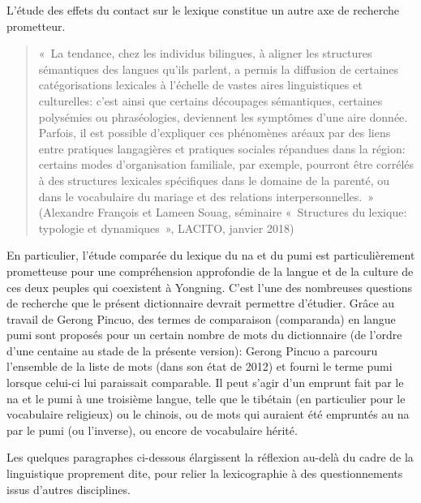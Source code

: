 L'étude des effets du contact sur le lexique constitue un autre axe de recherche prometteur.

\begin{quote}
« La tendance, chez les individus bilingues, à aligner les structures sémantiques des langues qu’ils parlent, a permis la diffusion de certaines catégorisations lexicales à l’échelle de vastes aires linguistiques et culturelles: c’est ainsi que certains découpages sémantiques, certaines polysémies ou phraséologies, deviennent les symptômes d’une aire donnée. Parfois, il est possible d’expliquer ces phénomènes aréaux par des liens entre pratiques langagières et pratiques sociales répandues dans la région: certains modes d’organisation familiale, par exemple, pourront être corrélés à des structures lexicales spécifiques dans le domaine de la parenté, ou dans le vocabulaire du mariage et des relations interpersonnelles. » (Alexandre François et Lameen Souag, séminaire « Structures du lexique: typologie et dynamiques », LACITO, janvier 2018)
\end{quote}

En particulier, l'étude comparée du lexique du na et du pumi \parencite{daudey2014} est particulièrement prometteuse pour une compréhension approfondie de la langue et de la culture de ces deux peuples qui coexistent à Yongning. C'est l'une des nombreuses questions de recherche que le présent dictionnaire devrait permettre d'étudier. Grâce au travail de Gerong Pincuo, des termes de comparaison (comparanda) en langue pumi sont proposés pour un certain nombre de mots du dictionnaire (de l'ordre d'une centaine au stade de la présente version): Gerong Pincuo  a parcouru l'ensemble de la liste de mots (dans son état de 2012) et fourni le terme pumi lorsque celui-ci lui paraissait comparable. Il peut s'agir d'un emprunt fait par le na et le pumi à une troisième langue, telle que le tibétain (en particulier pour le vocabulaire religieux) ou le chinois, ou de mots qui auraient été empruntés au na par le pumi (ou l'inverse), ou encore de vocabulaire hérité.

Les quelques paragraphes ci-dessous élargissent la réflexion au-delà du cadre de la linguistique proprement dite, pour relier la lexicographie à des questionnements issus d'autres disciplines.

